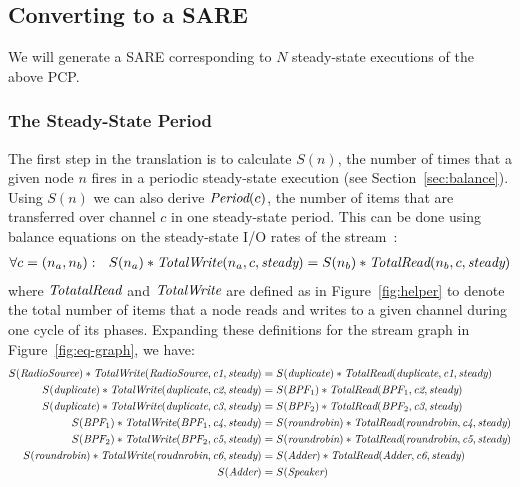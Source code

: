 \subsection{Converting to a SARE}

We will generate a SARE corresponding to $N$ steady-state executions
of the above PCP.

\subsubsection{The Steady-State Period}

The first step in the translation is to calculate $S(n)$, the number
of times that a given node $n$ fires in a periodic steady-state
execution (see Section~\ref{sec:balance}).  Using $S(n)$ we can also
derive $\mbox{\it Period}(c)$, the number of items that are transferred over
channel $c$ in one steady-state period.  This can be done using
balance equations on the steady-state I/O rates of the
stream~\cite{leesdf}:
\begin{align*}
\forall c = (n_a, n_b):~~S(n_a) * \mbox{\it TotalWrite}(n_a, c, \mbox{\it steady}) 
  = S(n_b) * \mbox{\it TotalRead}(n_b, c, \mbox{\it steady})
\end{align*}
\clearpage \noindent
where $\mbox{\it TotatalRead}$ and $\mbox{\it TotalWrite}$ are defined as in
Figure~\ref{fig:helper} to denote the total number of items that a
node reads and writes to a given channel during one cycle of its
phases.  Expanding these definitions for the stream graph in
Figure~\ref{fig:eq-graph}, we have:
\begin{align*}
S(\mbox{\it RadioSource}) * \mbox{\it TotalWrite}(\mbox{\it RadioSource}, \mbox{\it c1}, \mbox{\it steady}) 
  &= S(\mbox{\it duplicate}) * \mbox{\it TotalRead}(\mbox{\it duplicate}, \mbox{\it c1}, \mbox{\it steady}) \\
S(\mbox{\it duplicate}) * \mbox{\it TotalWrite}(\mbox{\it duplicate}, \mbox{\it c2}, \mbox{\it steady}) 
  &= S(\mbox{\it BPF}_1) * \mbox{\it TotalRead}(\mbox{\it BPF}_1, \mbox{\it c2}, \mbox{\it steady}) \\
S(\mbox{\it duplicate}) * \mbox{\it TotalWrite}(\mbox{\it duplicate}, \mbox{\it c3}, \mbox{\it steady})
  &= S(\mbox{\it BPF}_2) * \mbox{\it TotalRead}(\mbox{\it BPF}_2, \mbox{\it c3}, \mbox{\it steady}) \\
S(\mbox{\it BPF}_1) * \mbox{\it TotalWrite}(\mbox{\it BPF}_1, \mbox{\it c4}, \mbox{\it steady}) 
  &= S(\mbox{\it roundrobin}) * \mbox{\it TotalRead}(\mbox{\it roundrobin}, \mbox{\it c4}, \mbox{\it steady}) \\
S(\mbox{\it BPF}_2) * \mbox{\it TotalWrite}(\mbox{\it BPF}_2, \mbox{\it c5}, \mbox{\it steady}) 
  &= S(\mbox{\it roundrobin}) * \mbox{\it TotalRead}(\mbox{\it roundrobin}, \mbox{\it c5}, \mbox{\it steady}) \\
S(\mbox{\it roundrobin}) * \mbox{\it TotalWrite}(\mbox{\it roudnrobin}, \mbox{\it c6}, \mbox{\it steady})
  &= S(\mbox{\it Adder}) * \mbox{\it TotalRead}(\mbox{\it Adder}, \mbox{\it c6}, \mbox{\it steady}) \\
S(\mbox{\it Adder}) 
  &= S(\mbox{\it Speaker})
\end{align*}
